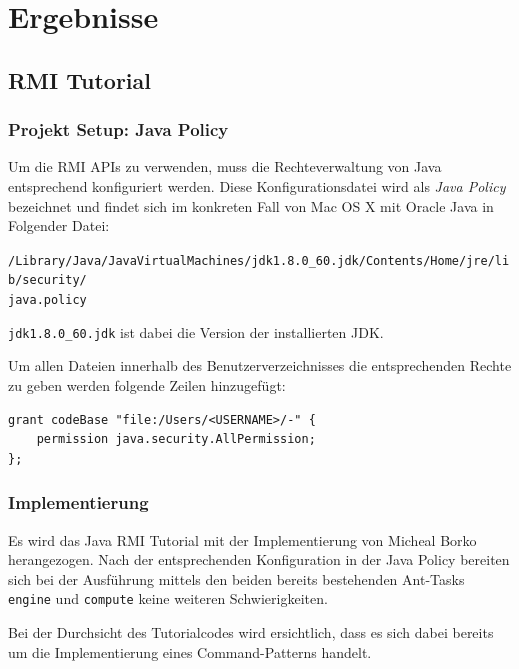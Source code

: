 
\section{Ergebnisse}
\label{sec:Ergebnisse}


\subsection{RMI Tutorial}

\subsubsection{Projekt Setup: Java Policy}
Um die RMI APIs zu verwenden, muss die Rechteverwaltung von Java entsprechend konfiguriert werden.
Diese Konfigurationsdatei wird als \textit{Java Policy} bezeichnet und findet sich im konkreten Fall von Mac OS X mit Oracle Java in Folgender Datei:

\texttt{/Library/Java/JavaVirtualMachines/jdk1.8.0\_60.jdk/Contents/Home/jre/lib/security/\\java.policy}

\texttt{jdk1.8.0\_60.jdk} ist dabei die Version der installierten JDK.

Um allen Dateien innerhalb des Benutzerverzeichnisses die entsprechenden Rechte zu geben werden folgende Zeilen hinzugef\"ugt:

\begin{lstlisting}[caption=\"Anderungen in der Java Policy]
grant codeBase "file:/Users/<USERNAME>/-" {
    permission java.security.AllPermission;
};
\end{lstlisting}

\subsubsection{Implementierung}
Es wird das Java RMI Tutorial\cite{rmi-tutorial} mit der Implementierung von Micheal Borko\cite{rmi-tutorial-impl} herangezogen.
Nach der entsprechenden Konfiguration in der Java Policy bereiten sich bei der Ausf\"uhrung mittels den beiden bereits bestehenden Ant-Tasks \texttt{engine} und \texttt{compute} keine weiteren Schwierigkeiten.

Bei der Durchsicht des Tutorialcodes wird ersichtlich, dass es sich dabei bereits um die Implementierung eines Command-Patterns handelt.

